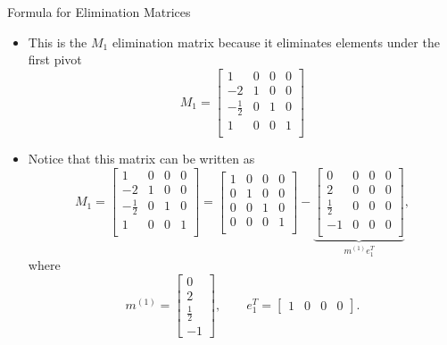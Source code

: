 \documentclass[10pt]{beamer}
\begin{document}
\begin{frame}{Formula for Elimination Matrices}
\begin{itemize}
    \item This is the $M_1$ elimination matrix because it eliminates elements under the first pivot 
        $$
        M_1=\begin{bmatrix}
    1 & 0 & 0 & 0\\
    -2 & 1 & 0 & 0\\
    -\frac{1}{2} & 0 & 1 & 0\\
    1 & 0 & 0 & 1\\
    \end{bmatrix}
        $$
    \item Notice that this matrix can be written as
            $$
        M_1=\begin{bmatrix}
    1 & 0 & 0 & 0\\
    -2 & 1 & 0 & 0\\
    -\frac{1}{2} & 0 & 1 & 0\\
    1 & 0 & 0 & 1\\
    \end{bmatrix} = \begin{bmatrix}
    1 & 0 & 0 & 0\\
    0 & 1 & 0 & 0\\
    0 & 0 & 1 & 0\\
    0 & 0 & 0 & 1\\
    \end{bmatrix}-\underbrace{\begin{bmatrix}
    0 & 0 & 0 & 0\\
    2 & 0 & 0 & 0\\
    \frac{1}{2} & 0 & 0 & 0\\
    -1 & 0 & 0 & 0\\
    \end{bmatrix}}_{m^{(1)}e_1^T},
        $$
    where
    \[
    m^{(1)}=
    \begin{bmatrix}
        0\\2\\\frac12\\-1
    \end{bmatrix},
    \qquad
    e_1^T=
    \begin{bmatrix}
        1&0&0&0
    \end{bmatrix}.
    \]
   
\end{itemize}
\end{frame}
\end{document}
